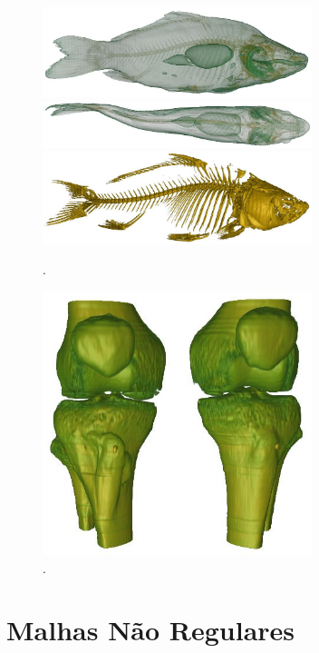 \begin{figure}[H]
	\centering
	\subfigure
	{
		\includegraphics[width=0.7\textwidth]{images/r_m_carp}
	}
	\subfigure
	{
		\includegraphics[width=0.7\textwidth]{images/r_m_carp_up}
	}
	\subfigure
	{
		\includegraphics[width=0.7\textwidth]{images/r_m_carp_exo}
	}
	\caption{.}
\end{figure}

\begin{figure}[H]
	\centering
	\includegraphics[width=0.7\textwidth]{images/r_m_knee}
	\caption{.}
\end{figure}

\section{Malhas Não Regulares}
\label{sec:result.irreg}